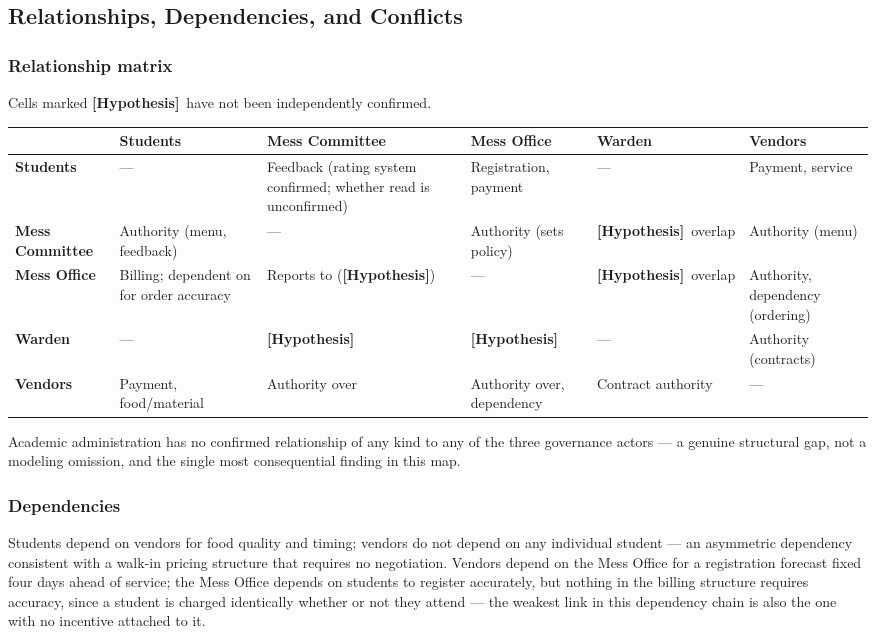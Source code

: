 \documentclass[11pt]{article}
\newcommand{\hypo}{\textbf{[Hypothesis]}}
\begin{document}
\subsection{Relationships, Dependencies, and Conflicts}

\subsubsection*{Relationship matrix}

Cells marked \hypo\ have not been independently confirmed.

{\small\setlength{\tabcolsep}{3pt}
\begin{longtable}{L{0.13\textwidth}L{0.155\textwidth}L{0.155\textwidth}L{0.155\textwidth}L{0.14\textwidth}L{0.155\textwidth}}
\toprule
 & \textbf{Students} & \textbf{Mess Committee} & \textbf{Mess Office} & \textbf{Warden} & \textbf{Vendors} \\
\midrule
\endhead
\textbf{Students} & --- & Feedback (rating system confirmed; whether read is
unconfirmed) & Registration, payment & --- & Payment, service \\[4pt]
\textbf{Mess Committee} & Authority (menu, feedback) & --- & Authority (sets policy)
& \hypo\ overlap & Authority (menu) \\[4pt]
\textbf{Mess Office} & Billing; dependent on for order accuracy & Reports to
(\hypo) & --- & \hypo\ overlap & Authority, dependency (ordering) \\[4pt]
\textbf{Warden} & --- & \hypo & \hypo & --- & Authority (contracts) \\[4pt]
\textbf{Vendors} & Payment, food/material & Authority over & Authority over,
dependency & Contract authority & --- \\
\bottomrule
\end{longtable}}

Academic administration has no confirmed relationship of any kind to any of the
three governance actors --- a genuine structural gap, not a modeling omission, and
the single most consequential finding in this map.

\subsubsection*{Dependencies}

Students depend on vendors for food quality and timing; vendors do not depend on any
individual student --- an asymmetric dependency consistent with a walk-in pricing
structure that requires no negotiation. Vendors depend on the Mess Office for a
registration forecast fixed four days ahead of service; the Mess Office depends on
students to register accurately, but nothing in the billing structure requires
accuracy, since a student is charged identically whether or not they attend --- the
weakest link in this dependency chain is also the one with no incentive attached to
it.
\end{document}
